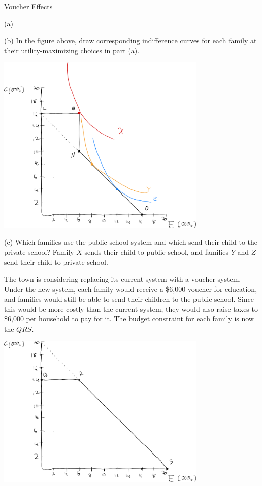 \documentclass[10pt]{extarticle}
\begin{document}
\begin{problem}{Voucher Effects}
\begin{problem}{(a)}
\begin{description}[font=\normalfont]
      \end{description}
    \end{problem}
    \begin{problem}{(b)}
      In the figure above, draw corresponding indifference curves for each family at their utility-maximizing choices in part (a).
      \tcblower
      \begin{center}
        \includegraphics[width=10cm]{4_2_b}
      \end{center}
    \end{problem}
    \begin{problem}{(c)}
      Which families use the public school system and which send their child to the private school?
      \tcblower
      Family $X$ sends their child to public school, and families $Y$ and $Z$ send their child to private school.
    \end{problem}
    The town is considering replacing its current system with a voucher system. Under the new system, each family would receive a \$6,000 voucher for education, and families would still be able to send their children to the public school. Since this would be more costly than the current system, they would also raise taxes to \$6,000 per household to pay for it. The budget constraint for each family is now the $QRS$.
    \begin{center}
      \includegraphics[width=10cm]{4_2_1}

\end{center}
\end{problem}
\end{document}

